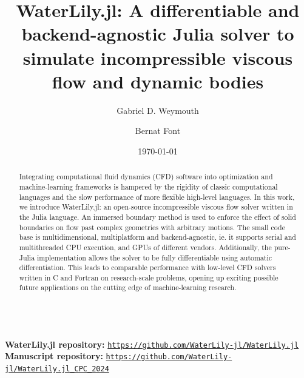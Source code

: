 \documentclass[10pt,a4paper]{article}
\title{\textbf{WaterLily.jl: A differentiable and backend-agnostic Julia solver to simulate incompressible viscous flow and dynamic bodies}}
\author[1]{Gabriel D. Weymouth}
\author[1,2,\footnote{\href{mailto:b.font@tudelft.nl}{\texttt{b.font@tudelft.nl}}}]{Bernat Font}
\affil[1]{Faculty of Mechanical Engineering, Delft University of Technology, Delft, Netherlands}
\affil[2]{Barcelona Supercomputing Center, Barcelona, Spain}
\date{\today}
\begin{document}
{\let\newpage\relax\maketitle}
\setlength{\parindent}{0pt}
\setlength{\parskip}{8pt}

\date{\vspace{-20pt}}
\begin{abstract}
Integrating computational fluid dynamics (CFD) software into optimization and machine-learning frameworks is hampered by the rigidity of classic computational languages and the slow performance of more flexible high-level languages. In this work, we introduce WaterLily.jl: an open-source incompressible viscous flow solver written in the Julia language. An immersed boundary method is used to enforce the effect of solid boundaries on flow past complex geometries with arbitrary motions. The small code base is multidimensional, multiplatform and backend-agnostic, ie. it supports serial and multithreaded CPU execution, and GPUs of different vendors. Additionally, the pure-Julia implementation allows the solver to be fully differentiable using automatic differentiation.  This leads to comparable performance with low-level CFD solvers written in C and Fortran on research-scale problems, opening up exciting possible future applications on the cutting edge of machine-learning research.
\end{abstract}

\begin{small}
  \noindent
  \\
  \textbf{WaterLily.jl repository:} \href{https://github.com/WaterLily-jl/WaterLily.jl}{\texttt{https://github.com/WaterLily-jl/WaterLily.jl}}\\
  \textbf{Manuscript repository:} \href{https://github.com/WaterLily-jl/WaterLily.jl_CPC_2024}{\texttt{https://github.com/WaterLily-jl/WaterLily.jl\_CPC\_2024}}
\end{small}
\end{document}
